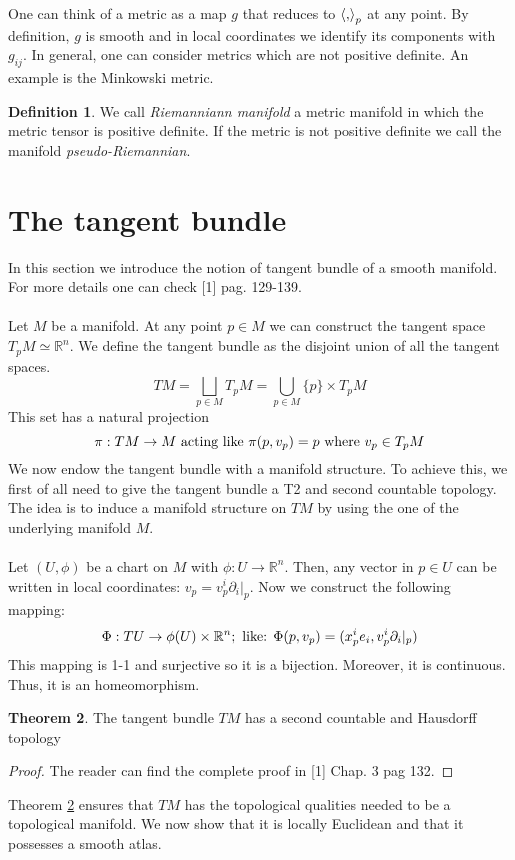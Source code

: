 \documentclass[12pt,a4paper]{report}
\theoremstyle{definition}
\newtheorem{Def}{Definition}[chapter]
\theoremstyle{Theorem}
\newtheorem{Theo}[Def]{Theorem}
\theoremstyle{definition}
\theoremstyle{definition}
\begin{document}
	One can think of a metric as a map $g$ that reduces to $\braket{,}_p$ at any point. By definition, $g$ is smooth and in local coordinates we identify its components with $g_{ij}$.
	In general, one can consider metrics which are not positive definite. An example is the Minkowski metric.
	\begin{Def}
		We call \textit{Riemanniann manifold} a metric manifold in which the metric tensor is positive definite. If the metric is not positive definite we call the manifold \textit{pseudo-Riemannian}.
	\end{Def}
	\section{The tangent bundle}
	In this section we introduce the notion of tangent bundle of a smooth manifold. For more details one can check [1] pag. 129-139.\\
	\\
	Let $M$ be a manifold. At any point $p\in M$ we can construct the tangent space $T_pM\simeq \mathbb{R}^n$. We define the tangent bundle as the disjoint union of all the tangent spaces.
	$$TM=\bigsqcup_{p\in M}T_pM=\bigcup_{p\in M} \{p\}\times T_pM$$
	This set has a natural projection 
	$$\pi:TM\rightarrow M\hbox{ acting like }\pi(p,v_p)=p \hbox{ where }v_p\in T_pM$$  
	We now endow the tangent bundle with a manifold structure. To achieve this, we first of all need to give the tangent bundle a T2 and second countable topology. The idea is to induce a manifold structure on $TM$ by using the one of the underlying manifold $M$.\\
	\\
	Let $(U,\phi)$ be a chart on $M$ with $\phi:U\rightarrow \mathbb{R}^n$. Then, any vector in $p\in U$ can be written in local coordinates: $v_p=v^i_p\partial_i|_p$. Now we construct the following mapping:
	$$\Phi:TU\rightarrow \phi(U)\times \mathbb{R}^n; \hbox{ like: }
	\Phi(p,v_p)=(x^i_pe_i,v^i_p\partial_i|_p)$$
	This mapping is 1-1 and surjective so it is a bijection. Moreover, it is continuous. Thus, it is an homeomorphism.
	\begin{Theo} \label{Theo_1.1}
		The tangent bundle $TM$ has a second countable and Hausdorff topology
	\end{Theo}
	\begin{proof}
		The reader can find the complete proof in [1] Chap. 3 pag 132.
	\end{proof}
	Theorem \ref{Theo_1.1} ensures that $TM$ has the topological qualities needed to be a topological manifold. We now show that it is locally Euclidean and that it possesses a smooth atlas.
\end{document}

